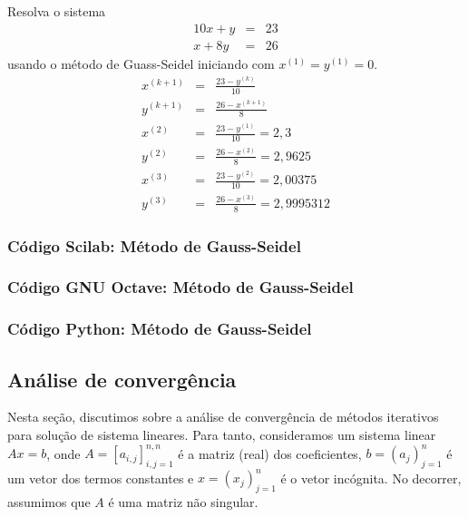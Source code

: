 \begin{ex}
Resolva o sistema
\begin{eqnarray*}
  10x+y&=&23\\
  x+8y&=&26
\end{eqnarray*}
usando o método de Guass-Seidel iniciando com $x^{(1)}=y^{(1)}=0$.
\begin{eqnarray*}
x^{(k+1)}&=&\frac{23-y^{(k)}}{10}\\
y^{(k+1)}&=&\frac{26-x^{(k+1)}}{8}\\
x^{(2)}&=&\frac{23-y^{(1)}}{10}=2,3\\
y^{(2)}&=&\frac{26-x^{(2)}}{8}=2,9625\\
x^{(3)}&=&\frac{23-y^{(2)}}{10}=2,00375  \\
y^{(3)}&=&\frac{26-x^{(3)}}{8}=2,9995312
\end{eqnarray*}
\end{ex}

\ifisscilab
\subsubsection{Código Scilab: Método de Gauss-Seidel}


\fi
\ifisoctave
\subsubsection{Código GNU Octave: Método de Gauss-Seidel}


\fi
\ifispython
\subsubsection{Código Python: Método de Gauss-Seidel}


\fi

\subsection{Análise de convergência}

Nesta seção, discutimos sobre a análise de convergência de métodos iterativos para solução de sistema lineares. Para tanto, consideramos um sistema linear $Ax = b$, onde $A = [a_{i,j}]_{i,j=1}^{n,n}$ é a matriz (real) dos coeficientes, $b = (a_j)_{j=1}^n$ é um vetor dos termos constantes e $x = (x_j)_{j=1}^n$ é o vetor incógnita. No decorrer, assumimos que $A$ é uma matriz não singular.


